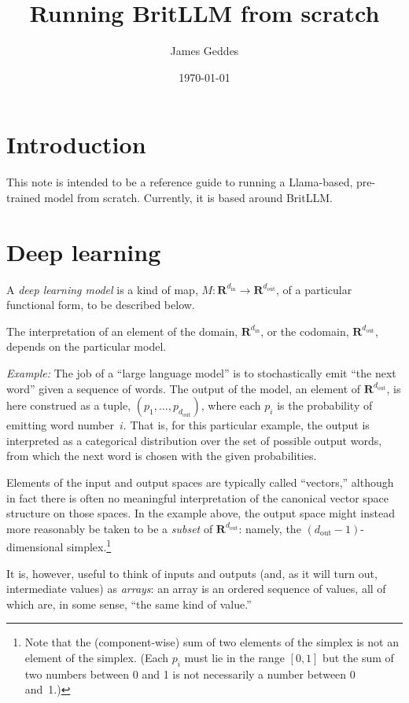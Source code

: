 \documentclass[11pt, a4paper]{article}
\title{Running BritLLM from scratch}
\author{James Geddes}
\date{\today}
\newcommand{\setR}{\mathbold{R}}
\begin{document}
\maketitle

\section{Introduction}

This note is intended to be a reference guide to running a
Llama-based, pre-trained model from scratch. Currently, it is based
around BritLLM.

\section{Deep learning}
A \emph{deep learning model} is a kind of map,
$M\colon \setR^{d_\text{in}} \to \setR^{d_\text{out}}$, of a particular
functional form, to be described below.

The interpretation of an element of the domain, $\setR^{d_\text{in}}$,
or the codomain, $\setR^{d_\text{out}}$, depends on the particular
model.

\emph{Example:} The job of a ``large language model'' is to
stochastically emit ``the next word'' given a sequence of words. The
output of the model, an element of $\setR^{d_\text{out}}$, is here
construed as a tuple, $(p_1, \dotsc, p_{d_\text{out}})$, where each
$p_i$ is the probability of emitting word number~$i$. That is, for
this particular example, the output is interpreted as a categorical
distribution over the set of possible output words, from which the
next word is chosen with the given probabilities.

Elements of the input and output spaces are typically called
``vectors,'' although in fact there is often no meaningful
interpretation of the canonical vector space structure on those
spaces. In the example above, the output space might instead more
reasonably be taken to be a \emph{subset} of $\setR^{d_\text{out}}$:
namely, the $(d_\text{out}-1)$-dimensional simplex.\footnote{Note that
  the (component-wise) sum of two elements of the simplex is not an
  element of the simplex. (Each $p_i$ must lie in the range $[0,1]$
  but the sum of two numbers between 0 and 1 is not necessarily a
  number between 0 and~1.)}

It is, however, useful to think of inputs and outputs (and, as it will
turn out, intermediate values) as \emph{arrays}: an array is an
ordered sequence of values, all of which are, in some sense, ``the
same kind of value.''
\end{document}
